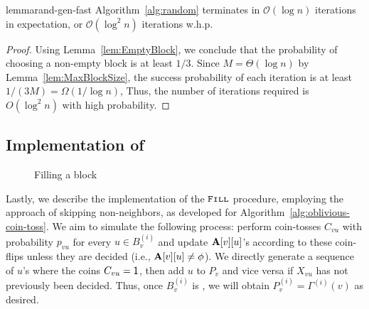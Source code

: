\begin{restatable}{lemma}{rand-gen-fast}
\label{lem:rand_gen_fast}
Algorithm~\ref{alg:random} terminates in $\mathcal{O}(\log n)$ iterations in expectation, or $\mathcal{O}(\log^2 n)$ iterations w.h.p.
\end{restatable}
\begin{proof}
Using Lemma~\ref{lem:EmptyBlock}, we conclude that
the probability of choosing a non-empty block is at least $1/3$.
Since $M = \Theta(\log n)$ by Lemma~\ref{lem:MaxBlockSize}, the success probability of each iteration is at least $1/(3M)=\Omega(1/\log n)$,
Thus, the number of iterations required is $O(\log^2 n)$ with high probability.
\end{proof}





\subsection{Implementation of }
\label{sec:fill_implement}

\begin{wrapfigure}[13]{R}{0.39\textwidth}
\vspace{-0.5em}
\begin{framed}
    \renewcommand\figurename{Algorithm}
    \caption{Filling a block}
    \label{alg:fill}
    \begin{algorithmic}
                \EndIf
            \EndWhile
    \EndProcedure
    \end{algorithmic}
\end{framed}
\end{wrapfigure}

Lastly, we describe the implementation of the $\texttt{\textsc{Fill}}$ procedure, employing the approach of skipping non-neighbors, as developed for Algorithm~\ref{alg:oblivious-coin-toss}. We aim to simulate the following process: perform coin-tosses $C_{vu}$ with probability $p_{vu}$ for every $u \in B^{(i)}_v$ and update $\mathbf{A}[v][u]$'s according to these coin-flips unless they are decided (i.e., $\mathbf{A}[v][u] \neq \phi$). We directly generate a sequence of $u$'s where the coins $C_{vu} = \mathsf{1}$, then add $u$ to $P_v$ and vice versa if $X_{vu}$ has not previously been decided. Thus, once $B^{(i)}_v$ is \filled, we will obtain $P_v^{(i)} = \Gamma^{(i)}(v)$ as desired.

